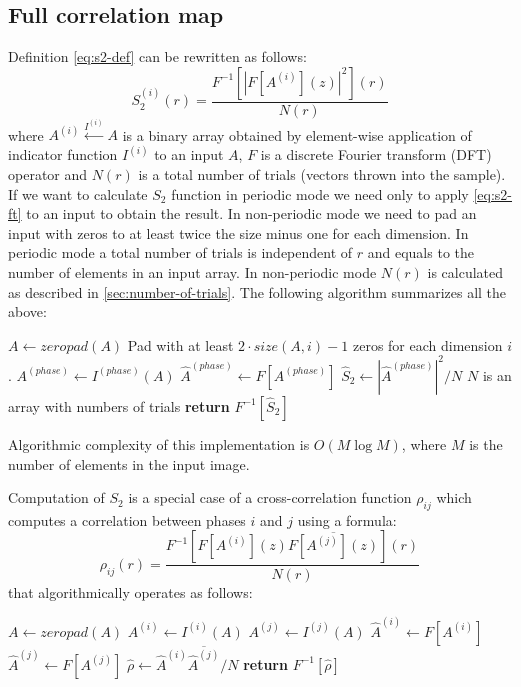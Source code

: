 \documentclass[1p]{elsarticle}
\begin{document}
\subsection{Full correlation map}
\label{sec:map}
Definition \cref{eq:s2-def} can be rewritten as follows:
\begin{equation}
  S_2^{(i)}(r) = \frac{F^{-1} [|F [A^{(i)}](z)|^2] (r)}{N(r)} \label{eq:s2-ft}
\end{equation}
where $A^{(i)} \xleftarrow{I^{(i)}} A$ is a binary array obtained by element-wise
application of indicator function $I^{(i)}$ to an input $A$, $F$ is a discrete
Fourier transform (DFT) operator and $N(r)$ is a total number of trials (vectors
thrown into the sample). If we want to calculate $S_2$ function in periodic mode
we need only to apply \cref{eq:s2-ft} to an input to obtain the result. In
non-periodic mode we need to pad an input with zeros to at least twice the size
minus one for each dimension. In periodic mode a total number of trials is
independent of $r$ and equals to the number of elements in an input array. In
non-periodic mode $N(r)$ is calculated as described in
\cref{sec:number-of-trials}. The following algorithm summarizes all the above:
\begin{algorithmic}[1]
  \State $A \gets zeropad(A)$
  \Comment Pad with at least $2\cdot size(A, i) - 1$ zeros for each dimension $i$.
  \EndIf
  \State $A^{(phase)} \gets I^{(phase)} (A)$
  \State $\hat{A}^{(phase)} \gets F[A^{(phase)}]$
  \State $\hat{S}_2 \gets |\hat{A}^{(phase)}|^2 / N$
  \Comment $N$ is an array with numbers of trials
  \State \textbf{return} $F^{-1} [\hat{S}_2]$
  \EndProcedure
\end{algorithmic}
Algorithmic complexity of this implementation is $O(M \log M)$, where $M$ is the
number of elements in the input image.

Computation of $S_2$ is a special case of a cross-correlation function $\rho_{ij}$
which computes a correlation between phases $i$ and $j$ using a formula:
\begin{equation}
  \rho_{ij}(r) = \frac{F^{-1} [F[A^{(i)}](z) \overline{F[A^{(j)}](z)}] (r)}{N(r)} \label{eq:cross-ft}
\end{equation}
that algorithmically operates as follows:
\begin{algorithmic}[1]
    \State $A \gets zeropad(A)$
  \EndIf
  \State $A^{(i)} \gets I^{(i)} (A)$
  \State $A^{(j)} \gets I^{(j)} (A)$
  \State $\hat{A}^{(i)} \gets F[A^{(i)}]$
  \State $\hat{A}^{(j)} \gets F[A^{(j)}]$
  \State $\hat{\rho} \gets \hat{A}^{(i)} \overline{\hat{A}^{(j)}} / N$
  \State \textbf{return} $F^{-1} [\hat{\rho}]$
  \EndProcedure
\end{algorithmic}
\end{document}
